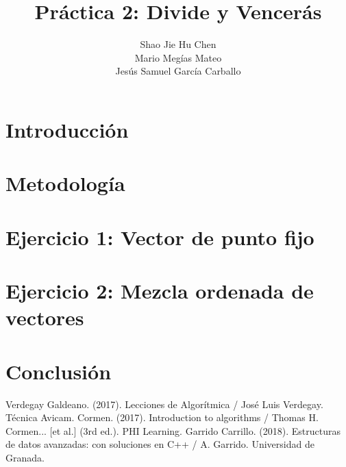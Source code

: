 \documentclass{homework}
\title{Práctica 2: Divide y Vencerás}
\author{Shao Jie Hu Chen \\ Mario Megías Mateo \\ Jesús Samuel García Carballo}
\begin{document}
    \maketitle
    \tableofcontents
    \newpage

    \section{Introducción}
    
    \newpage

    \section{Metodología}
    
    \newpage

    \section{Ejercicio 1: Vector de punto fijo}
    
    \newpage
    
    \section{Ejercicio 2: Mezcla ordenada de vectores}
    
    \newpage

    \section{Conclusión}
    
    \newpage

    \newpage
    \begin{thebibliography}{0}
         Verdegay Galdeano. (2017). Lecciones de Algorítmica / José Luis Verdegay. Técnica Avicam.
         Cormen. (2017). Introduction to algorithms / Thomas H. Cormen... [et al.] (3rd ed.). PHI Learning.
         Garrido Carrillo. (2018). Estructuras de datos avanzadas: con soluciones en C++ / A. Garrido. Universidad de Granada.        
    \end{thebibliography}
\end{document}
